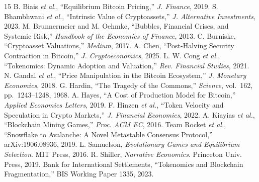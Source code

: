 \documentclass[11pt,a4paper]{article}
\begin{document}
\vfill
\begin{thebibliography}{15}
 B. Biais \textit{et al.}, ``Equilibrium Bitcoin Pricing,'' \emph{J. Finance}, 2019.
 S. Bhambhwani \textit{et al.}, ``Intrinsic Value of Cryptoassets,'' \emph{J. Alternative Investments}, 2023.
 M. Brunnermeier and M. Oehmke, ``Bubbles, Financial Crises, and Systemic Risk,'' \emph{Handbook of the Economics of Finance}, 2013.
 C. Burniske, ``Cryptoasset Valuations,'' \emph{Medium}, 2017.
 A. Chen, ``Post-Halving Security Contraction in Bitcoin,'' \emph{J. Cryptoeconomics}, 2025.
 L. W. Cong \textit{et al.}, ``Tokenomics: Dynamic Adoption and Valuation,'' \emph{Rev. Financial Studies}, 2021.
 N. Gandal \textit{et al.}, ``Price Manipulation in the Bitcoin Ecosystem,'' \emph{J. Monetary Economics}, 2018.
 G. Hardin, ``The Tragedy of the Commons,'' \emph{Science}, vol.~162, pp.~1243--1248, 1968.
 A. Hayes, ``A Cost of Production Model for Bitcoin,'' \emph{Applied Economics Letters}, 2019.
 F. Hinzen \textit{et al.}, ``Token Velocity and Speculation in Crypto Markets,'' \emph{J. Financial Economics}, 2022.
 A. Kiayias \textit{et al.}, ``Blockchain Mining Games,'' \emph{Proc. ACM EC}, 2016.
 Team Rocket \textit{et al.}, ``Snowflake to Avalanche: A Novel Metastable Consensus Protocol,'' arXiv:1906.08936, 2019.
 L. Samuelson, \emph{Evolutionary Games and Equilibrium Selection}. MIT Press, 2016.
 R. Shiller, \emph{Narrative Economics}. Princeton Univ. Press, 2019.
 Bank for International Settlements, ``Tokenomics and Blockchain Fragmentation,'' BIS Working Paper 1335, 2023.
\end{thebibliography}
\end{document}
